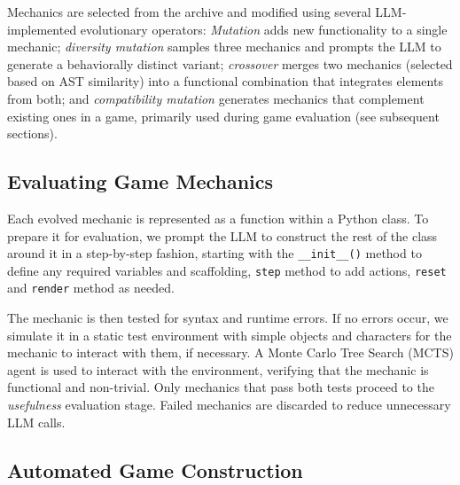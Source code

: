 \documentclass{article} %
\begin{document}
Mechanics are selected from the archive and modified using several LLM-implemented evolutionary operators: \textit{Mutation} adds new functionality to a single mechanic; \textit{diversity mutation} samples three mechanics and prompts the LLM to generate a behaviorally distinct variant; \textit{crossover} merges two mechanics (selected based on AST similarity) into a functional combination that integrates elements from both; and \textit{compatibility mutation} generates mechanics that complement existing ones in a game, primarily used during game evaluation (see subsequent sections).

\subsection{Evaluating Game Mechanics}

Each evolved mechanic is represented as a function within a Python class. To prepare it for evaluation, we prompt the LLM to construct the rest of the class around it in a step-by-step fashion, starting with the \texttt{\_\_init\_\_()} method to define any required variables and scaffolding, \texttt{step} method to add actions, \texttt{reset} and \texttt{render} method as needed. 

The mechanic is then tested for syntax and runtime errors. If no errors occur, we simulate it in a static test environment with simple objects and characters for the mechanic to interact with them, if necessary. A Monte Carlo Tree Search (MCTS) agent is used to interact with the environment, verifying that the mechanic is functional and non-trivial. Only mechanics that pass both tests proceed to the \textit{usefulness} evaluation stage. Failed mechanics are discarded to reduce unnecessary LLM calls.


\subsection{Automated Game Construction}
\end{document}
